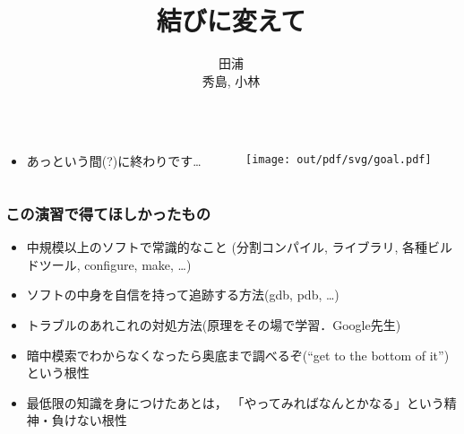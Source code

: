 \documentclass[12pt,dvipdfmx]{beamer}
\title{結びに変えて}
\institute{}
\author{田浦 \\ 秀島, 小林}
\date{}
\newcommand{\ao}[1]{{\color{blue}#1}}
\begin{document}
\maketitle

\begin{frame}
\begin{columns}
\begin{column}{0.4\textwidth}
\begin{itemize}
\item あっという間(?)に終わりです\ldots
\end{itemize}
\end{column}
\begin{column}{0.6\textwidth}
\begin{center}
\texttt{[image: out/pdf/svg/goal.pdf]}
\end{center}
\end{column}
\end{columns}
\end{frame}

\begin{frame}
\frametitle{この演習で得てほしかったもの}
\begin{itemize}
\item<1-> 中規模以上のソフトで常識的なこと
  \ao{(分割コンパイル, ライブラリ, 各種ビルドツール, configure, make, \ldots)}
\item<2-> ソフトの中身を自信を持って追跡する方法\ao{(gdb, pdb, \ldots)}
\item<3-> トラブルのあれこれの対処方法\ao{(原理をその場で学習．Google先生)}
\item<4-> 暗中模索でわからなくなったら奥底まで調べるぞ(``get to the bottom of it'')
  という\ao{根性}
\item<5-> 最低限の知識を身につけたあとは，
「やってみればなんとかなる」という精神・負けない\ao{根性}
\end{itemize}
\end{frame}
\end{document}
